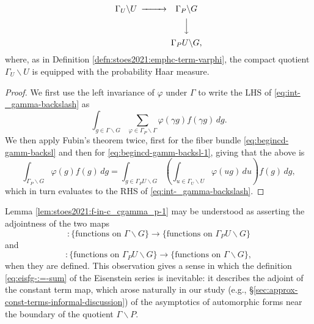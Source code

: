 \documentclass[reqno]{amsart} 
\begin{document}
\begin{lemma}
\begin{itemize}
    \begin{equation}\label{eq:begincd-gamm-backsl-1}
      \begin{CD}         
        \Gamma_U \backslash U  @>>>  \Gamma_P \backslash G \\
        @.  @VVV \\
        @. \Gamma_P U \backslash G, \\
      \end{CD}
    \end{equation}
    where, as in Definition \ref{defn:stoes2021:emphc-term-varphi}, the compact quotient $\Gamma_U \backslash U$ is equipped with the probability Haar measure.
  \end{itemize}
\end{lemma}
\begin{proof}
  We first use the left invariance of $\varphi$ under $\Gamma$ to write the LHS of \eqref{eq:int-_gamma-backslash} as
  \begin{equation*}
    \int _{g \in \Gamma \backslash G} \sum _{\varphi \in \Gamma_P \backslash \Gamma } \varphi(\gamma g) f(\gamma g) \, d g.
  \end{equation*}
  We then apply Fubin's theorem twice, first for the fiber bundle \eqref{eq:begincd-gamm-backsl} and then for \eqref{eq:begincd-gamm-backsl-1}, giving that the above is
  \begin{equation*}
    \int _{\Gamma_P \backslash G} \varphi(g) f(g) \,d g 
    = \int _{g \in \Gamma_P U \backslash G} \left( \int _{u \in \Gamma_U \backslash U} \varphi (u g) \,d u \right) f(g) \, d g,
  \end{equation*}
  which in turn evaluates to the RHS of \eqref{eq:int-_gamma-backslash}.
\end{proof}

Lemma \ref{lem:stoes2021:f-in-c_cgamma_p-1} may be understood as asserting the adjointness of the two maps
\begin{equation*}
  [\varphi \mapsto \varphi_P] : \{\text{functions on } \Gamma \backslash G\} \rightarrow \{\text{functions on } \Gamma_P U \backslash G\}
\end{equation*}
and
\begin{equation*}
  [f \mapsto \Eis(f)] :\{\text{functions on } \Gamma_P U \backslash G\}  \rightarrow \{\text{functions on } \Gamma \backslash G\},
\end{equation*}
when they are defined.  This observation gives a sense in which the definition \eqref{eq:eisfg-:=-sum} of the Eisenstein series is inevitable: it describes the adjoint of the constant term map, which arose naturally in our study (e.g., \S\ref{sec:approx-const-terms-informal-discussion}) of the asymptotics of automorphic forms near the boundary of the quotient $\Gamma \backslash P$.
\end{document}
